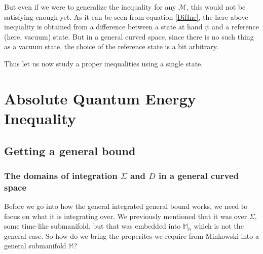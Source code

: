 \documentclass[a4paper,11pt]{article}
\numberwithin{equation}{section}
\theoremstyle{definition}
\begin{document}
But even if we were to generalize the inequality for any $\mathcal{M}$, this would not be satisfying enough yet. As it can be seen from equation \ref{DifIne}, the here-above inequality is obtained from a difference between a state at hand $\psi$ and a reference (here, vacuum) state. But in a general curved space, since there is no such thing as a vacuum state, the choice of the reference state is a bit arbitrary. 

Thus let us now study a proper inequalities using a single state.

\section{Absolute Quantum Energy Inequality}
\subsection{Getting a general bound}
\subsubsection{The domains of integration $\Sigma$ and $D$ in a general curved space}
Before we go into how the general integrated general bound works, we need to focus on what it is integrating over. We previously mentioned that it was over $\Sigma$, some time-like submanifold, but that was embedded into $\mathbb{M}_n$ which is not the general case. So how do we bring the properites we require from Minkowski into a general submanifold $\mathbb{M}$?
\end{document}
